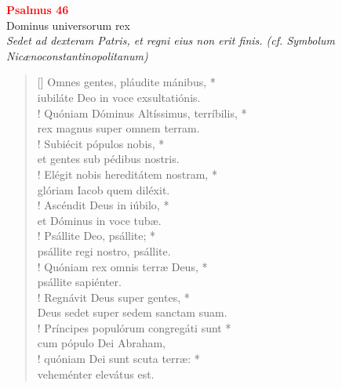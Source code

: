 


\def\greinitialformat#1{%
{\fontsize{39}{39}\selectfont #1}%
}




\vspace{0.3cm}
\begin{center}
 \textcolor{red}{\large \bf Psalmus 46}\\
Dominus universorum rex\\
\textit{\small Sedet ad dexteram Patris, et regni eius non erit finis. (cf. Symbolum Nicænoconstantinopolitanum)}
\end{center}
\begin{verse}[\versewidth]
Omnes gentes, pláudite mánibus, *\\
iubiláte Deo in voce exsultatiónis.\\!
\vin Quóniam Dóminus Altíssimus, terríbilis, *\\
\vin rex magnus super omnem terram.\\!
Subiécit pópulos nobis, *\\
et gentes sub pédibus nostris.\\!
\vin Elégit nobis hereditátem nostram, *\\
\vin glóriam Iacob quem diléxit.\\!
Ascéndit Deus in iúbilo, *\\
et Dóminus in voce tubæ.\\!
\vin Psállite Deo, psállite; *\\
\vin psállite regi nostro, psállite.\\!
Quóniam rex omnis terræ Deus, *\\
psállite sapiénter.\\!
\vin Regnávit Deus super gentes, *\\
\vin Deus sedet super sedem sanctam suam.\\!
Príncipes populórum congregáti sunt *\\
cum pópulo Dei Abraham,\\!
\vin quóniam Dei sunt scuta terræ: *\\
\vin veheménter elevátus est.\\
\end{verse}
\vspace{1cm}


